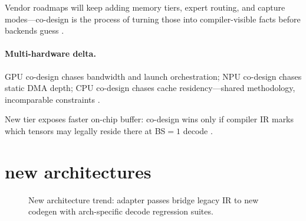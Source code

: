 Vendor roadmaps will keep adding memory tiers, expert routing, and capture modes---co-design is the process of turning those into compiler-visible facts before backends guess \citep{semianalysis2024tma,liu2024deepseekv3,nvidia2024cudagraphs,yirage2026,chen2020compilerbasedhardw,patel2025llminference,kwon2023vllm,memoryfloor2026,taxbreak2026,amd2024aie,dlbook,amd2024xdna,dao2022flashattention,dao2023flashdecoding,nvidia2024cudagraphs,nvidia2022hopper,amd2024xdna}.

\paragraph{Multi-hardware delta.} GPU co-design chases bandwidth and launch orchestration; NPU co-design chases static DMA depth; CPU co-design chases cache residency---shared methodology, incomparable constraints \citep{amd2024xdna,amd2024aie,dlbook,chen2020compilerbasedhardw,yirage2026,patel2025llminference,kwon2023vllm,liu2024deepseekv3,memoryfloor2026,taxbreak2026,semianalysis2024tma,dao2022flashattention,dao2023flashdecoding,nvidia2024cudagraphs,nvidia2022hopper}.

\begin{example}
New tier exposes faster on-chip buffer: co-design wins only if compiler IR marks which tensors may legally reside there at BS${=}1$ decode \citep{semianalysis2024tma,memoryfloor2026,yirage2026,chen2020compilerbasedhardw,patel2025llminference,kwon2023vllm,liu2024deepseekv3,taxbreak2026,amd2024aie,dlbook,dao2022flashattention,dao2023flashdecoding,nvidia2024cudagraphs,nvidia2022hopper,amd2024xdna}.
\end{example}

\section{new architectures}
\label{sec:ch27_new_architectures}


\begin{figure}[t]
\centering
{}
\caption{New architecture trend: adapter passes bridge legacy IR to new codegen with arch-specific decode regression suites.}
\label{fig:new_architectures_architecture}
\end{figure}

